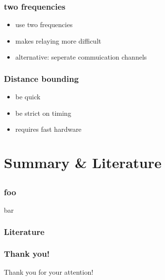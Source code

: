 \documentclass[12pt]{beamer}
\begin{document}
	\begin{frame}
		\frametitle{two frequencies}
			\begin{itemize}
				\item use two frequencies
				\item makes relaying more difficult %
				\item alternative: seperate commuication channels
			\end{itemize}
	\end{frame}

	\begin{frame}
		\frametitle{Distance bounding}
			\begin{itemize}
				\item be quick
				\item be strict on timing
				\item requires fast hardware
			\end{itemize}
	\end{frame}

\section{Summary \& Literature}
\subsection*{}
	\begin{frame}
		\frametitle{foo}
		bar
	\end{frame}
	\begin{frame}
	\frametitle{Literature}
	\tiny
	\nocite{*}
		\def\newblock{}
		
		
	\end{frame}

	\begin{frame}
		\frametitle{Thank you!}
		\begin{center}
			Thank you for your attention!
		\end{center}
	\end{frame}	
\end{document}
